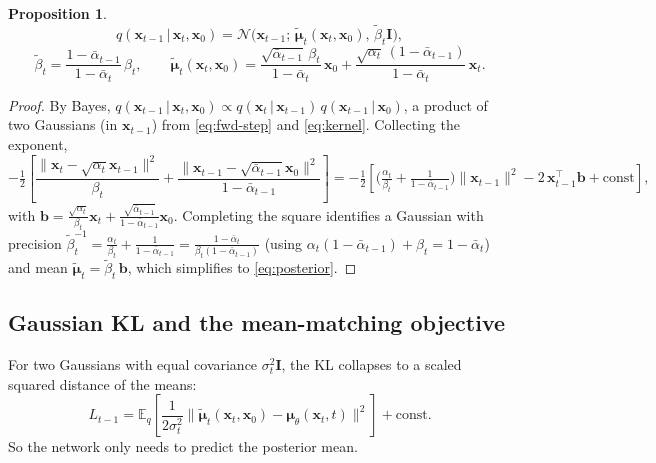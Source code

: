 \documentclass[12pt,a4paper]{article}
\newtheorem{proposition}{Proposition}
\newcommand{\E}{\mathbb{E}}
\newcommand{\N}{\mathcal{N}}
\newcommand{\x}{\bm{x}}
\newcommand{\II}{\mathbf{I}}
\newcommand{\abar}{\bar{\alpha}}
\newcommand{\given}{\,\vert\,}
\begin{document}
\begin{proposition}
\begin{equation}
q(\x_{t-1}\given\x_t,\x_0)=\N\!\big(\x_{t-1};\,\tilde{\bm\mu}_t(\x_t,\x_0),\,\tilde\beta_t\II\big),
\end{equation}
\begin{equation}
\tilde\beta_t=\frac{1-\abar_{t-1}}{1-\abar_t}\,\beta_t,
\qquad
\tilde{\bm\mu}_t(\x_t,\x_0)=\frac{\sqrt{\abar_{t-1}}\,\beta_t}{1-\abar_t}\,\x_0
+\frac{\sqrt{\alpha_t}\,(1-\abar_{t-1})}{1-\abar_t}\,\x_t.
\label{eq:posterior}
\end{equation}
\end{proposition}
\begin{proof}
By Bayes,
$q(\x_{t-1}\given\x_t,\x_0)\propto q(\x_t\given\x_{t-1})\,q(\x_{t-1}\given\x_0)$,
a product of two Gaussians (in $\x_{t-1}$) from \eqref{eq:fwd-step} and
\eqref{eq:kernel}. Collecting the exponent,
\[
-\tfrac12\!\left[\frac{\|\x_t-\sqrt{\alpha_t}\x_{t-1}\|^2}{\beta_t}
+\frac{\|\x_{t-1}-\sqrt{\abar_{t-1}}\x_0\|^2}{1-\abar_{t-1}}\right]
=-\tfrac12\!\left[\Big(\tfrac{\alpha_t}{\beta_t}+\tfrac{1}{1-\abar_{t-1}}\Big)\|\x_{t-1}\|^2
-2\,\x_{t-1}^\top\bm b+\text{const}\right],
\]
with $\bm b=\frac{\sqrt{\alpha_t}}{\beta_t}\x_t+\frac{\sqrt{\abar_{t-1}}}{1-\abar_{t-1}}\x_0$.
Completing the square identifies a Gaussian with precision
$\tilde\beta_t^{-1}=\frac{\alpha_t}{\beta_t}+\frac{1}{1-\abar_{t-1}}=\frac{1-\abar_t}{\beta_t(1-\abar_{t-1})}$
(using $\alpha_t(1-\abar_{t-1})+\beta_t=1-\abar_t$) and mean
$\tilde{\bm\mu}_t=\tilde\beta_t\,\bm b$, which simplifies to \eqref{eq:posterior}.
\end{proof}

\subsection{Gaussian KL and the mean-matching objective}
For two Gaussians with equal covariance $\sigma_t^2\II$, the KL collapses to a
scaled squared distance of the means:
\begin{equation}
L_{t-1}=\E_q\!\left[\frac{1}{2\sigma_t^2}\big\|\tilde{\bm\mu}_t(\x_t,\x_0)-\bm\mu_\theta(\x_t,t)\big\|^2\right]+\text{const}.
\label{eq:meanmatch}
\end{equation}
So the network only needs to predict the posterior mean.
\end{document}
